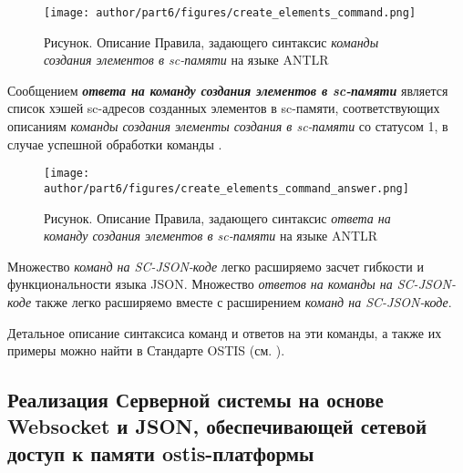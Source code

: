 \begin{figure}[htbp]
	\center
	\caption{Рисунок. Описание Правила, задающего синтаксис \textit{команды создания элементов в sc-памяти} на языке ANTLR}
	\texttt{[image: author/part6/figures/create\_elements\_command.png]}
	\label{fig:create_elements_command}
\end{figure}

Сообщением \textbf{\textit{ответа на команду создания элементов в sc-памяти}} является список хэшей sc-адресов созданных элементов в sc-памяти, соответствующих описаниям \textit{команды создания элементы создания в sc-памяти} со статусом 1, в случае успешной обработки команды .

\begin{figure}[htbp]
	\center
	\caption{Рисунок. Описание Правила, задающего синтаксис \textit{ответа на команду создания элементов в sc-памяти} на языке ANTLR}
	\texttt{[image: author/part6/figures/create\_elements\_command\_answer.png]}
	\label{fig:create_elements_command_answer}
\end{figure}

Множество \textit{команд на SC-JSON-коде} легко расширяемо засчет гибкости и функциональности языка JSON. Множество \textit{ответов на команды на SC-JSON-коде} также легко расширяемо вместе с расширением \textit{команд на SC-JSON-коде}.

Детальное описание синтаксиса команд и ответов на эти команды, а также их примеры можно найти в Стандарте OSTIS (см. ).

\subsection{Реализация Серверной системы на основе Websocket и JSON, обеспечивающей сетевой доступ к памяти ostis-платформы}
\label{sec_soft_platform_sc_server}

